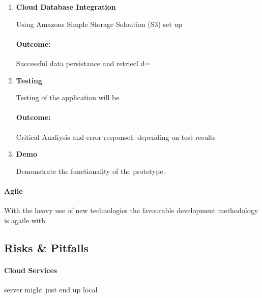 \documentclass[a4paper, 11pt]{article}
\begin{document}
{\begin{enumerate}
\begin{flushleft}
	\paragraph{Outcome:} Main logic implemented. Program should persist the contents of the fridge and respond to change in state and priority listing of items. Successful Messages and request handeling form server.
	\vspace{\baselineskip}
  	\end{flushleft}
	
	   \item \textbf{Cloud Database Integration}
   	\begin{flushleft} Using Amazons Simple Storage Soloution (S3) set up
	\paragraph{Outcome:} Successful data persistance and retriecl d=
	\vspace{\baselineskip}
  	\end{flushleft}
	
   \item \textbf{Testing}
   	\begin{flushleft}Testing of the application will be 
  	\paragraph{Outcome:} Critical Analiysis and error responset. depending on test results
	\vspace{\baselineskip}
  	\end{flushleft}
	
	   \item \textbf{Demo}
   	\begin{flushleft}Demonstrate the functionality of the prototype.
  	\end{flushleft}
\end{enumerate}

\paragraph{Agile}With the heavy use of new technologies the favourable development methodology is agaile with



\subsection{Risks \& Pitfalls}
\paragraph{Cloud Services}
server might just end up local

}
\end{document}
